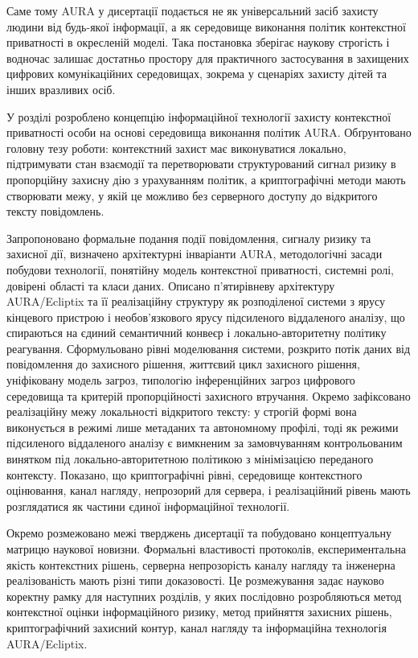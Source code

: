 Саме тому AURA у дисертації подається не як універсальний засіб захисту людини від будь-якої інформації, а як середовище виконання політик контекстної приватності в окресленій моделі. Така постановка зберігає наукову строгість і водночас залишає достатньо простору для практичного застосування в захищених цифрових комунікаційних середовищах, зокрема у сценаріях захисту дітей та інших вразливих осіб.


У розділі розроблено концепцію інформаційної технології захисту контекстної приватності особи на основі середовища виконання політик AURA. Обґрунтовано головну тезу роботи: контекстний захист має виконуватися локально, підтримувати стан взаємодії та перетворювати структурований сигнал ризику в пропорційну захисну дію з урахуванням політик, а криптографічні методи мають створювати межу, у якій це можливо без серверного доступу до відкритого тексту повідомлень.

Запропоновано формальне подання події повідомлення, сигналу ризику та захисної дії, визначено архітектурні інваріанти AURA, методологічні засади побудови технології, понятійну модель контекстної приватності, системні ролі, довірені області та класи даних. Описано п'ятирівневу архітектуру AURA/Ecliptix та її реалізаційну структуру як розподіленої системи з ярусу кінцевого пристрою і необов'язкового ярусу підсиленого віддаленого аналізу, що спираються на єдиний семантичний конвеєр і локально-авторитетну політику реагування. Сформульовано рівні моделювання системи, розкрито потік даних від повідомлення до захисного рішення, життєвий цикл захисного рішення, уніфіковану модель загроз, типологію інференційних загроз цифрового середовища та критерій пропорційності захисного втручання. Окремо зафіксовано реалізаційну межу локальності відкритого тексту: у строгій формі вона виконується в режимі лише метаданих та автономному профілі, тоді як режими підсиленого віддаленого аналізу є вимкненим за замовчуванням контрольованим винятком під локально-авторитетною політикою з мінімізацією переданого контексту. Показано, що криптографічні рівні, середовище контекстного оцінювання, канал нагляду, непрозорий для сервера, і реалізаційний рівень мають розглядатися як частини єдиної інформаційної технології.

Окремо розмежовано межі тверджень дисертації та побудовано концептуальну матрицю наукової новизни. Формальні властивості протоколів, експериментальна якість контекстних рішень, серверна непрозорість каналу нагляду та інженерна реалізованість мають різні типи доказовості. Це розмежування задає науково коректну рамку для наступних розділів, у яких послідовно розробляються метод контекстної оцінки інформаційного ризику, метод прийняття захисних рішень, криптографічний захисний контур, канал нагляду та інформаційна технологія AURA/Ecliptix.
